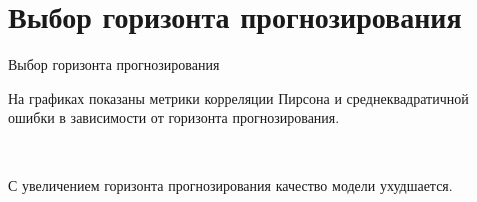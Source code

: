 \documentclass[10pt,pdf,hyperref={unicode}]{beamer}
\begin{document}
\section{Выбор горизонта прогнозирования}
\begin{frame}{Выбор горизонта прогнозирования}

На графиках показаны метрики корреляции Пирсона и среднеквадратичной ошибки в зависимости от горизонта прогнозирования.

\begin{figure}[h!t]\center
{}
\\
\end{figure}

С увеличением горизонта прогнозирования качество модели ухудшается.

\end{frame}

\end{document}
